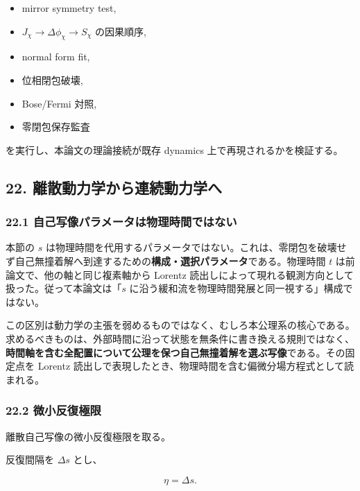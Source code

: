 \documentclass[
  a4paper,
]{ltjsarticle}
\providecommand{\tightlist}{%
  \setlength{\itemsep}{0pt}\setlength{\parskip}{0pt}}
\begin{document}
\begin{itemize}
\tightlist
\item
  mirror symmetry test,
\item
  \(J_\chi\to\Delta\phi_\chi\to S_\chi\) の因果順序,
\item
  normal form fit,
\item
  位相閉包破壊,
\item
  Bose/Fermi 対照,
\item
  零閉包保存監査
\end{itemize}

を実行し、本論文の理論接続が既存 dynamics 上で再現されるかを検証する。

\subsection{22.
離散動力学から連続動力学へ}\label{ux96e2ux6563ux52d5ux529bux5b66ux304bux3089ux9023ux7d9aux52d5ux529bux5b66ux3078}

\subsubsection{22.1
自己写像パラメータは物理時間ではない}\label{ux81eaux5df1ux5199ux50cfux30d1ux30e9ux30e1ux30fcux30bfux306fux7269ux7406ux6642ux9593ux3067ux306fux306aux3044}

本節の \(s\)
は物理時間を代用するパラメータではない。これは、零閉包を破壊せず自己無撞着解へ到達するための\textbf{構成・選択パラメータ}である。物理時間
\(t\) は前論文で、他の軸と同じ複素軸から Lorentz
読出しによって現れる観測方向として扱った。従って本論文は「\(s\)
に沿う緩和流を物理時間発展と同一視する」構成ではない。

この区別は動力学の主張を弱めるものではなく、むしろ本公理系の核心である。求めるべきものは、外部時間に沿って状態を無条件に書き換える規則ではなく、\textbf{時間軸を含む全配置について公理を保つ自己無撞着解を選ぶ写像}である。その固定点を
Lorentz
読出しで表現したとき、物理時間を含む偏微分場方程式として読まれる。

\subsubsection{22.2
微小反復極限}\label{ux5faeux5c0fux53cdux5fa9ux6975ux9650}

離散自己写像の微小反復極限を取る。

反復間隔を \(\Delta s\) とし、

\[
\eta=\Delta s.
\]
\end{document}
